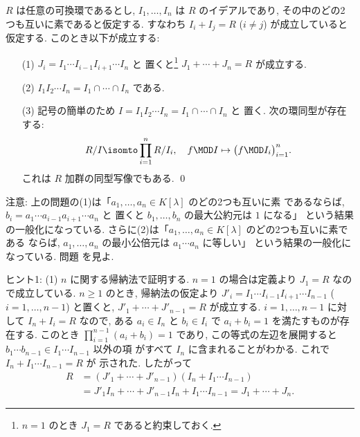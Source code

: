\documentclass[12pt,twoside]{jarticle}
\begin{document}
\begin{question}[中国式剰余定理]
\label{q:Chinese-remainder-theorem}
  $R$ は任意の可換環であるとし, $I_1,\dots,I_n$ は $R$ のイデアルであり,
  その中のどの2つも互いに素であると仮定する. すなわち $I_i+I_j=R$ ($i\ne j$) 
  が成立していると仮定する.  このとき以下が成立する:
  \begin{enumerate}
  \item[(1)] $J_i=I_1\cdots I_{i-1}I_{i+1}\cdots I_n$ と
    置くと\footnote{$n=1$ のとき $J_1=R$ であると約束しておく.} %
    $J_1+\cdots+J_n=R$ が成立する.
  \item[(2)] $I_1I_2\cdots I_n=I_1\cap\cdots\cap I_n$ である.
  \item[(3)] 記号の簡単のため $I=I_1I_2\cdots I_n=I_1\cap\cdots\cap I_n$ と
    置く. 次の環同型が存在する:
    \begin{equation*}
      R/I \isomto \prod_{i=1}^n R/I_i,
      \quad
      f\MOD I \mapsto \bigl(f\MOD I_i\bigr)_{i=1}^n.
    \end{equation*}
    これは $R$ 加群の同型写像でもある.
    \qed
  \end{enumerate}
\end{question}

\noindent
注意: 上の問題の(1)は「$a_1,\dots,a_n\in K[\lambda]$ のどの2つも互いに素
であるならば, $b_i=a_1\cdots a_{i-1}a_{i+1}\cdots a_n$ と
置くと $b_1,\dots,b_n$ の最大公約元は $1$ になる」
という結果の一般化になっている.
さらに(2)は「$a_1,\dots,a_n\in K[\lambda]$ のどの2つも互いに素である
ならば, $a_1,\dots,a_n$ の最小公倍元は $a_1\cdots a_n$ に等しい」
という結果の一般化になっている.  
問題  を見よ.

\medskip
\noindent
ヒント1: (1) $n$ に関する帰納法で証明する.
$n=1$ の場合は定義より $J_1=R$ なので成立している.
$n\ge 1$ のとき, 
帰納法の仮定より $J'_i=I_1\cdots I_{i-1}I_{i+1}\cdots I_{n-1}$ 
($i=1,\dots,n-1$) と置くと, $J'_1+\cdots+J'_{n-1}=R$ が成立する.
$i=1,\dots,n-1$ に対して $I_n+I_i=R$ なので,
ある $a_i\in I_n$ と $b_i\in I_i$ で $a_i+b_i=1$ を満たすものが存在する.  
このとき $\prod_{i=1}^{n-1}(a_i+b_i)=1$ であり, 
この等式の左辺を展開すると $b_1\cdots b_{n-1}\in I_1\cdots I_{n-1}$ 以外の項
がすべて $I_n$ に含まれることがわかる.  これで $I_n+I_1\cdots I_{n-1}=R$ が
示された.  したがって
\begin{align*}
  R 
  &
  = (J'_1+\cdots+J'_{n-1})(I_n + I_1\cdots I_{n-1})
  \\ &
  = J'_1I_n + \cdots + J'_{n-1}I_n + I_1\cdots I_{n-1}
  = J_1+\cdots+J_n.
\end{align*}
\end{document}
